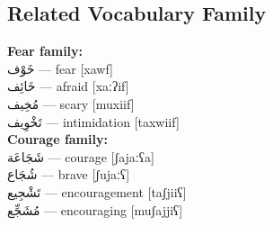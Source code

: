 \documentclass[a4paper,12pt]{article}
\begin{document}
\subsection{Related Vocabulary Family}
\begin{multicols}{2}
\textbf{Fear family:}\\
\textarabic{خَوْف} — fear [xawf]\\
\textarabic{خَائِف} — afraid [xaːʔif]\\
\textarabic{مُخِيف} — scary [muxiif]\\
\textarabic{تَخْوِيف} — intimidation [taxwiif]\\

\textbf{Courage family:}\\
\textarabic{شَجَاعَة} — courage [ʃajaːʕa]\\
\textarabic{شُجَاع} — brave [ʃujaːʕ]\\
\textarabic{تَشْجِيع} — encouragement [taʃjiiʕ]\\
\textarabic{مُشَجِّع} — encouraging [muʃajjiʕ]
\end{multicols}
\end{document}
